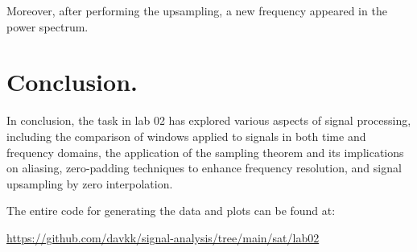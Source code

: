 \documentclass[13pt,a4paper]{article}
\begin{document}
Moreover, after performing the upsampling, a new frequency appeared in the power spectrum.


\pagebreak
\section{Conclusion.}

In conclusion, the task in lab 02 has explored various aspects of signal processing, including the comparison of windows applied to signals in both time and frequency domains, the application of the sampling theorem and its implications on aliasing, zero-padding techniques to enhance frequency resolution, and signal upsampling by zero interpolation.

The entire code for generating the data and plots can be found at:

\url{https://github.com/davkk/signal-analysis/tree/main/sat/lab02}
\end{document}
